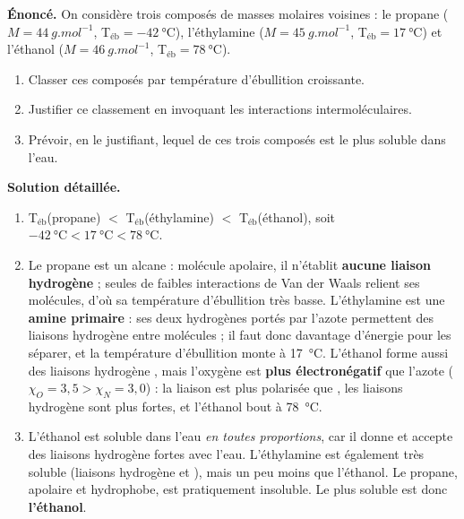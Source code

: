 \documentclass[11pt]{article}
\begin{document}
\begin{exoresolu}
\textbf{Énoncé.} On considère trois composés de masses molaires voisines : le propane  ($M = \SI{44}{g.mol^{-1}}$, T$_{\text{éb}} = \SI{-42}{\celsius}$), l'éthylamine  ($M = \SI{45}{g.mol^{-1}}$, T$_{\text{éb}} = \SI{17}{\celsius}$) et l'éthanol  ($M = \SI{46}{g.mol^{-1}}$, T$_{\text{éb}} = \SI{78}{\celsius}$).
\begin{enumerate}
\item Classer ces composés par température d'ébullition croissante.
\item Justifier ce classement en invoquant les interactions intermoléculaires.
\item Prévoir, en le justifiant, lequel de ces trois composés est le plus soluble dans l'eau.
\end{enumerate}
\tcblower
\textbf{Solution détaillée.}
\begin{enumerate}
\item T$_{\text{éb}}$(propane) $<$ T$_{\text{éb}}$(éthylamine) $<$ T$_{\text{éb}}$(éthanol), soit $\SI{-42}{\celsius} < \SI{17}{\celsius} < \SI{78}{\celsius}$.
\item Le propane est un alcane : molécule apolaire, il n'établit \textbf{aucune liaison hydrogène} ; seules de faibles interactions de Van der Waals relient ses molécules, d'où sa température d'ébullition très basse. L'éthylamine est une \textbf{amine primaire}  : ses deux hydrogènes portés par l'azote permettent des liaisons hydrogène  entre molécules ; il faut donc davantage d'énergie pour les séparer, et la température d'ébullition monte à \SI{17}{\celsius}. L'éthanol forme aussi des liaisons hydrogène , mais l'oxygène est \textbf{plus électronégatif} que l'azote ($\chi_O = 3{,}5 > \chi_N = 3{,}0$) : la liaison  est plus polarisée que , les liaisons hydrogène sont plus fortes, et l'éthanol bout à \SI{78}{\celsius}.
\item L'éthanol est soluble dans l'eau \emph{en toutes proportions}, car il donne et accepte des liaisons hydrogène fortes avec l'eau. L'éthylamine est également très soluble (liaisons hydrogène  et ), mais un peu moins que l'éthanol. Le propane, apolaire et hydrophobe, est pratiquement insoluble. Le plus soluble est donc \textbf{l'éthanol}.
\end{enumerate}
\end{exoresolu}
\end{document}
